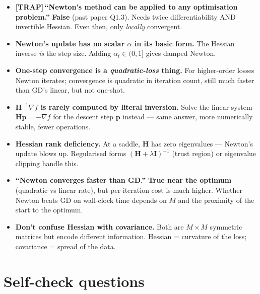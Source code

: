 \documentclass[11pt, a4paper]{article}
\newcommand{\trapflag}{\textcolor{trapBd}{\textbf{[TRAP]}}\,}
\begin{document}
\begin{itemize}
  \item \trapflag{}\textbf{``Newton's method can be applied to any optimisation problem.''} \textbf{False} (past paper Q1.3). Needs twice differentiability AND invertible Hessian. Even then, only \emph{locally} convergent.
  \item \textbf{Newton's update has no scalar $\alpha$ in its basic form.} The Hessian inverse \emph{is} the step size. Adding $\alpha_t \in (0,1]$ gives damped Newton.
  \item \textbf{One-step convergence is a \emph{quadratic-loss} thing.} For higher-order losses Newton iterates; convergence is quadratic in iteration count, still much faster than GD's linear, but not one-shot.
  \item \textbf{$\mathbf{H}^{-1}\nabla f$ is rarely computed by literal inversion.} Solve the linear system $\mathbf{H}\mathbf{p} = -\nabla f$ for the descent step $\mathbf{p}$ instead — same answer, more numerically stable, fewer operations.
  \item \textbf{Hessian rank deficiency.} At a saddle, $\mathbf{H}$ has zero eigenvalues — Newton's update blows up. Regularised forms $(\mathbf{H} + \lambda\mathbf{I})^{-1}$ (trust region) or eigenvalue clipping handle this.
  \item \textbf{``Newton converges faster than GD.''} \textbf{True near the optimum} (quadratic vs linear rate), but per-iteration cost is much higher. Whether Newton beats GD on wall-clock time depends on $M$ and the proximity of the start to the optimum.
  \item \textbf{Don't confuse Hessian with covariance.} Both are $M\times M$ symmetric matrices but encode different information. Hessian = curvature of the loss; covariance = spread of the data.
\end{itemize}

\section*{Self-check questions}
\end{document}
